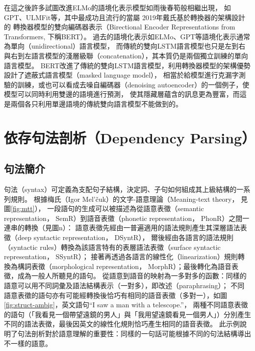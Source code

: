 在這之後許多試圖改進ELMo的語境化表示模型如雨後春筍般相繼出現，
如GPT\cite{radford2018improving}、ULMFit\cite{howard2018universal}等，其中最成功且流行的當屬
2019年戴氏\cite{devlin-etal-2019-bert}基於轉換器的架構設計的
轉換器模型的雙向編碼器表示（Birectional Encoder Representations from Transformers, 下稱BERT）。
過去的語境化表示如ELMo、GPT\cite{radford2018improving}等語境化表示通常為單向（unidirectional）語言模型，
而傳統的雙向LSTM語言模型也只是左到右與右到左語言模型的淺層級聯（concatenation），其本質仍是兩個獨立訓練的單向語言模型。
BERT改進了傳統的雙向LSTM語言模型，利用轉換器模型的架構優勢設計了遮蔽式語言模型（masked language model），
相當於給模型進行克漏字測驗的訓練，或也可以看成去噪自編碼器（denoising autoencoder）的一個例子，使模型可以同時利用雙邊的語境進行預測，
使其隱藏層蘊含的訊息更為豐富，而這是兩個各只利用單邊語境的傳統雙向語言模型不能做到的。

\label{subsec:cxtrep}
\section{依存句法剖析（Dependency Parsing）}
\subsection{句法簡介}

句法（syntax）可定義為支配句子結構，決定詞、子句如何組成其上級結構的一系列規則。
根據梅氏（Igor Mel’čuk）的文字-語意理論（Meaning-text theory， 見圖\ref{fig:mtt}），
一段語句的生成可以被描述為從語意表徵（semantic representation， SemR）到語音表徵（phonetic representation， PhonR）之間一連串的轉換（見圖n）：
語意表徵先經由一普遍適用的語法規則產生其深層語法表徵（deep syntactic representation， DSyntR），
爾後經由各語言的語法規則（syntactic rules）轉換為該語言特有的表層語法表徵（surface syntactic representation， SSyntR）；
接著再透過各語言的線性化（linearization）規則轉換為構詞表徵（morphological representation， MorphR）；最後轉化為語音表徵，成為一般人所聽見的語句。
從語意到語音的映射為一多對多的函數：同樣的語意可以用不同詞彙及語法結構表示（一對多），即改述（paraphrasing）；
不同語意表徵的語句亦有可能經轉換後恰巧有相同的語音表徵（多對一），如圖\ref{fig:struct-ambig}，英文語句``I saw a man with a telescope.''，
兩種不同語意表徵的語句（「我看見一個帶望遠鏡的男人」與「我用望遠鏡看見一個男人」）分別產生不同的語法表徵，最後因英文的線性化規則恰巧產生相同的語音表徵。
此示例說明了句法剖析對於語意理解的重要性：同樣的一句話可能根據不同的句法結構導出不一樣的語意。



%

